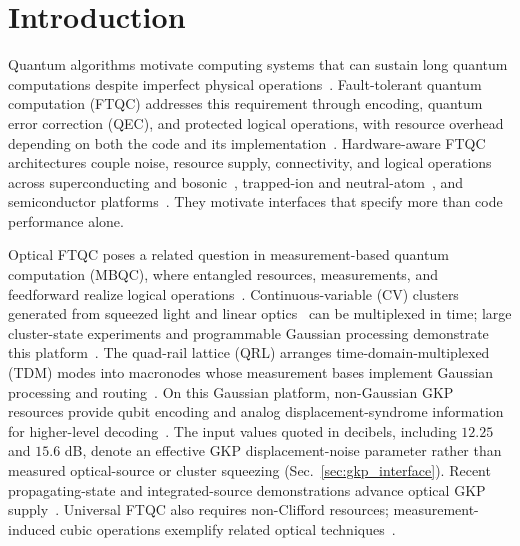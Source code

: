 \documentclass[aps,
prx,
superscriptaddress,
reprint,
longbibliography,
floatfix]{revtex4-2}
\begin{document}
\section{Introduction}

Quantum algorithms motivate computing systems that can sustain long quantum computations despite imperfect physical operations~\cite{Shor1994Algorithms,GidneyEkera2021RSA}. Fault-tolerant quantum computation (FTQC) addresses this requirement through encoding, quantum error correction (QEC), and protected logical operations, with resource overhead depending on both the code and its implementation~\cite{Fowler2012SurfaceCode}.
Hardware-aware FTQC architectures couple noise, resource supply, connectivity, and logical operations across superconducting and bosonic~\cite{Guillaud2019RepetitionCat,Kubica2023Erasure}, trapped-ion and neutral-atom~\cite{Nickerson2014Cells,Ramette2022Cavity,Cong2022Rydberg,Cai2023Looped}, and semiconductor platforms~\cite{Jones2012Layered}. They motivate interfaces that specify more than code performance alone.

Optical FTQC poses a related question in measurement-based quantum computation (MBQC), where entangled resources, measurements, and feedforward realize logical operations~\cite{Raussendorf2001OneWay,raussendorf2003measurement,Raussendorf2007Topological}. Continuous-variable (CV) clusters generated from squeezed light and linear optics~\cite{Weedbrook2012CVReview,Takeda2019PhotonicReview,fukui2022building,Menicucci2006CVCluster} can be multiplexed in time; large cluster-state experiments and programmable Gaussian processing demonstrate this platform~\cite{Yokoyama2013UltraLargeCluster,Yoshikawa2016OneMillionModes,Asavanant2019TDM2D,Larsen2019Deterministic2D,Yokoyama2025FullStackQRL}. The quad-rail lattice (QRL) arranges time-domain-multiplexed (TDM) modes into macronodes whose measurement bases implement Gaussian processing and routing~\cite{alexander2016flexible,MenicucciQRL2020,Walshe2021Macronode}.
On this Gaussian platform, non-Gaussian GKP resources provide qubit encoding and analog displacement-syndrome information for higher-level decoding~\cite{GKP2001,Menicucci2014FTCVCluster,walshe2020continuous}. The input values quoted in decibels, including $12.25$ and $15.6$ dB, denote an effective GKP displacement-noise parameter rather than measured optical-source or cluster squeezing (Sec.~\ref{sec:gkp_interface}). Recent propagating-state and integrated-source demonstrations advance optical GKP supply~\cite{Konno2024Science,Larsen2025Nature}. Universal FTQC also requires non-Clifford resources; measurement-induced cubic operations exemplify related optical techniques~\cite{Yukawa2013CubicNonlinearity,Miyata2016AdaptiveCubicGate,Marek2018NonlinearQuadratureGates,Konno2021NonlinearSqueezing,Sakaguchi2023NonlinearFeedforward}.
\end{document}
